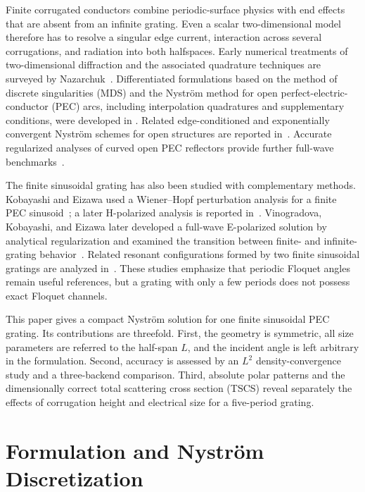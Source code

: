 \documentclass[conference]{IEEEtran}
\begin{document}
Finite corrugated conductors combine periodic-surface physics with end effects
that are absent from an infinite grating.  Even a scalar two-dimensional model
therefore has to resolve a singular edge current, interaction across several
corrugations, and radiation into both halfspaces.  Early numerical treatments
of two-dimensional diffraction and the associated quadrature techniques are
surveyed by Nazarchuk~\cite{nazarchuk1989}.  Differentiated formulations based
on the method of discrete singularities (MDS) and the Nystr\"om method for open
perfect-electric-conductor (PEC) arcs, including interpolation quadratures and
supplementary conditions, were developed in
\cite{nosich2005,nosich2007,nosich_josa2007,gandel2010}.  Related
edge-conditioned and exponentially convergent Nystr\"om schemes for open
structures are reported in~\cite{tong2006,tsalamengas2006,shapoval2011}.
Accurate regularized analyses of curved open PEC reflectors provide further
full-wave benchmarks~\cite{oguzer1995,oguzer2001}.

The finite sinusoidal grating has also been studied with complementary
methods.  Kobayashi and Eizawa used a Wiener--Hopf perturbation analysis for a
finite PEC sinusoid~\cite{kobayashi1991}; a later H-polarized analysis is reported
in~\cite{eizawa2014}.  Vinogradova, Kobayashi, and Eizawa later developed a
full-wave E-polarized solution by analytical regularization and examined the
transition between finite- and infinite-grating behavior~\cite{vinogradova2019}.
Related resonant configurations formed by two finite sinusoidal gratings are
analyzed in~\cite{vinogradova2021}.  These studies emphasize that periodic
Floquet angles remain useful references, but a grating with only a few periods
does not possess exact Floquet channels.

This paper gives a compact Nystr\"om solution for one finite sinusoidal PEC
grating.  Its contributions are threefold.  First, the geometry is symmetric,
all size parameters are referred to the half-span $L$, and the incident angle
is left arbitrary in the formulation.  Second, accuracy is assessed by an
$L^2$ density-convergence study and a three-backend comparison.  Third,
absolute polar patterns and the
dimensionally correct total scattering cross section (TSCS) reveal separately
the effects of corrugation height
and electrical size for a five-period grating.

\section{Formulation and Nystr\"om Discretization}
\label{sec:method}
\end{document}
